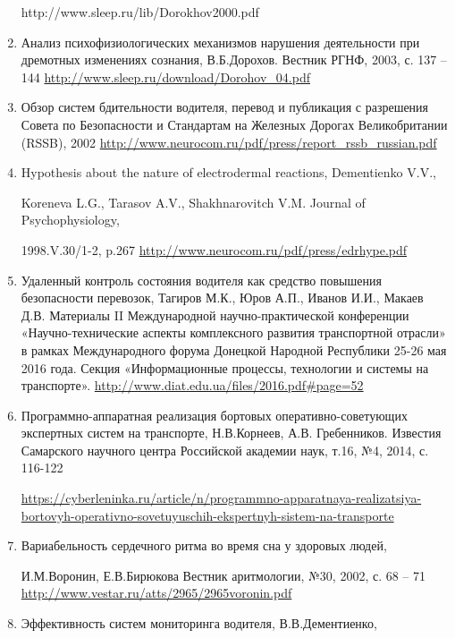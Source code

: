 \begin{enumerate}
    http://www.sleep.ru/lib/Dorokhov2000.pdf 
    \item Анализ психофизиологических механизмов нарушения деятельности при дремотных изменениях сознания, В.Б.Дорохов. Вестник РГНФ, 2003, с. 137 – 144
    \url{http://www.sleep.ru/download/Dorohov_04.pdf}
    \item Обзор систем бдительности водителя, перевод и публикация с разрешения Совета по Безопасности и Стандартам на Железных Дорогах Великобритании (RSSB), 2002
    \url{http://www.neurocom.ru/pdf/press/report_rssb_russian.pdf}
    \item Hypothesis about the nature of electrodermal reactions, Dementienko V.V., 
    
    Koreneva L.G., Tarasov A.V., Shakhnarovitch V.M. Journal of Psychophysiology, 
    
    1998.V.30/1-2, p.267
    \url{http://www.neurocom.ru/pdf/press/edrhype.pdf}
    \item Удаленный контроль состояния водителя как средство повышения безопасности перевозок, Тагиров М.К., Юров А.П., Иванов И.И., Макаев Д.В. Материалы II Международной научно-практической конференции «Научно-технические аспекты комплексного развития транспортной отрасли» в рамках Международного форума Донецкой Народной Республики 25-26 мая 2016 года. Секция «Информационные процессы, технологии и системы на транспорте».
    \url{http://www.diat.edu.ua/files/2016.pdf#page=52}
    \item Программно-аппаратная реализация бортовых оперативно-советующих экспертных систем на транспорте, Н.В.Корнеев, А.В. Гребенников. Известия Самарского научного центра Российской академии наук, т.16, №4, 2014, с. 116-122
    
    \url{https://cyberleninka.ru/article/n/programmno-apparatnaya-realizatsiya-bortovyh-operativno-sovetuyuschih-ekspertnyh-sistem-na-transporte}
    \item Вариабельность сердечного ритма во время сна у здоровых людей, 
    
    И.М.Воронин, Е.В.Бирюкова Вестник аритмологии, №30, 2002, с. 68 – 71
    \url{http://www.vestar.ru/atts/2965/2965voronin.pdf}
    \item Эффективность систем мониторинга водителя, В.В.Дементиенко, 
    

\end{enumerate}
